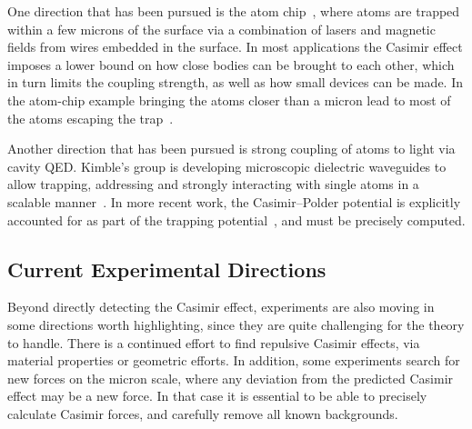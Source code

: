 One direction that has been pursued is the atom chip~\citep{Folman2000,Schneider2003,Salem2010},
where atoms are trapped within a few microns of the surface via a combination of lasers and magnetic fields from wires embedded in
the surface.  %
In most applications the Casimir effect imposes a lower bound on how close bodies can be brought 
to each other, which in turn limits the coupling strength, as well as how small devices can be made.
In the atom-chip example bringing the atoms closer than a micron lead to most of the atoms escaping the 
trap~\citep{Lin2004}.

Another direction that has been pursued is strong coupling of atoms to light via cavity QED.  
Kimble's group is developing microscopic dielectric waveguides to allow trapping, addressing and strongly interacting with  
single atoms in a scalable manner~\citep{Alton2011, Hung2013, Goban2014}.  In more recent work,
the Casimir--Polder potential is explicitly accounted for as part of the trapping potential~\citep{Goban2014},
and must be precisely computed.

\subsection{Current Experimental Directions}

Beyond directly detecting the Casimir effect, experiments are also moving in some directions worth highlighting,
since they are quite challenging for the theory to handle.
There is a continued effort to find repulsive Casimir effects, via material properties or geometric efforts.
In addition, some experiments search for new forces on the micron scale, where any deviation from the predicted
Casimir effect may be a new force.  In that case it is essential to be able to precisely calculate
Casimir forces, and carefully remove all known backgrounds. 


